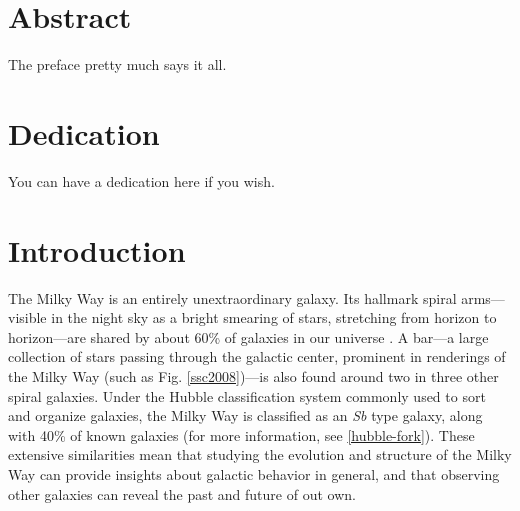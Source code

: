 \documentclass[12pt,twoside]{reedthesis}
\begin{document}
    \tableofcontents
    \listoftables
    \listoffigures

    \chapter*{Abstract}
	The preface pretty much says it all.

	\chapter*{Dedication}
	You can have a dedication here if you wish.

  \mainmatter %
  \pagestyle{fancyplain} %


    \chapter*{Introduction}


The Milky Way is an entirely unextraordinary galaxy. Its hallmark spiral arms---visible in the night sky as a bright smearing of stars, stretching from horizon to horizon---are shared by about 60\% of galaxies in our universe \citep{apm-bgc}. A bar---a large collection of stars passing through the galactic center, prominent in renderings of the Milky Way (such as Fig. \ref{ssc2008})---is also found around two in three other spiral galaxies. Under the Hubble classification system commonly used to sort and organize galaxies, the Milky Way is classified as an \emph{Sb} type galaxy, along with 40\% of known galaxies (for more information, see \ref{hubble-fork}). These extensive similarities mean that studying the evolution and structure of the Milky Way can provide insights about galactic behavior in general, and that observing other galaxies can reveal the past and future of out own.
\end{document}
